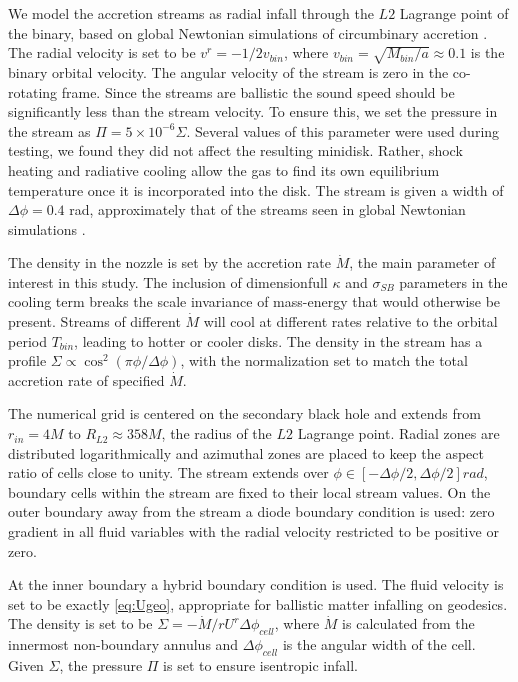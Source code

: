\documentclass{emulateapj}
\newcommand{\De}{\Delta}
\newcommand{\sig}{\sigma}
\newcommand{\Sig}{\Sigma}
\newcommand{\ka}{\kappa}
\begin{document}
We model the accretion streams as radial infall through the $L2$ Lagrange point of the binary, based on global Newtonian simulations of circumbinary accretion \citep{Farris14, Farris15A, Farris15B, DOrazio12, DOrazio16}.  The radial velocity is set to be $v^r = -1/2 v_{bin}$, where $v_{bin} = \sqrt{M_{bin}/a} \approx 0.1$ is the binary orbital velocity.  The angular velocity of the stream is zero in the co-rotating frame.  Since the streams are ballistic the sound speed should be significantly less than the stream velocity.  To ensure this, we set the pressure in the stream as $\Pi = 5 \times 10^{-6} \Sig$.  Several values of this parameter were used during testing, we found they did not affect the resulting minidisk. Rather, shock heating and radiative cooling allow the gas to find its own equilibrium temperature once it is incorporated into the disk.  The stream is given a width of $ \De \phi = 0.4$ rad, approximately that of the streams seen in global Newtonian simulations \cite{Farris14}.

The density in the nozzle is set by the accretion rate $\dot{M}$, the main parameter of interest in this study.  The inclusion of dimensionfull $\ka$ and $\sig_{SB}$ parameters in the cooling term breaks the scale invariance of mass-energy that would otherwise be present.  Streams of different $\dot{M}$ will cool at different rates relative to the orbital period $T_{bin}$, leading to hotter or cooler disks.  The density in the stream has a profile $\Sig \propto \cos^2(\pi \phi / \De \phi)$, with the normalization set to match the total accretion rate of specified $\dot{M}$.


The numerical grid is centered on the secondary black hole and extends from $r_{in} = 4 M$ to $R_{L2} \approx 358 M$, the radius of the $L2$ Lagrange point. Radial zones are distributed logarithmically and azimuthal zones are placed to keep the aspect ratio of cells close to unity. The stream extends over $\phi \in [-\De \phi / 2, \De \phi / 2] rad$, boundary cells within the stream are fixed to their local stream values. On the outer boundary away from the stream a diode boundary condition is used: zero gradient in all fluid variables with the radial velocity restricted to be positive or zero.

At the inner boundary a hybrid boundary condition is used.  The fluid velocity is set to be exactly \eqref{eq:Ugeo}, appropriate for ballistic matter infalling on geodesics.  The density is set to be $\Sig = -\dot{M} / r U^r \De \phi_{cell}$, where $\dot{M}$ is calculated from the innermost non-boundary annulus and $\De \phi_{cell}$ is the angular width of the cell.  Given $\Sig$, the pressure $\Pi$ is set to ensure isentropic infall.
\end{document}
